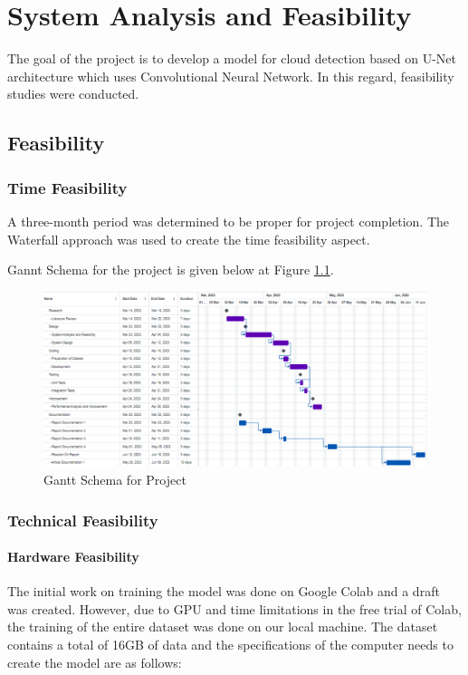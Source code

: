 \chapter{System Analysis and Feasibility}

The goal of the project is to develop a model for cloud detection based on U-Net architecture which uses Convolutional Neural Network. In this regard, feasibility studies were conducted.
\section{Feasibility}
\subsection{Time Feasibility}

A three-month period was determined to be proper for project completion. The Waterfall approach was used to create the time feasibility aspect.

Gannt Schema for the project is given below at Figure \ref{gannt}.
\begin{figure}[htp]
    \centering
    \includegraphics[width=15cm]{projectChapters/images/gannt.png}
    \caption{Gantt Schema for Project}
    \label{gannt}
\end{figure}

\subsection{Technical Feasibility}

\subsubsection{Hardware Feasibility}

The initial work on training the model was done on Google Colab and a draft was
created. However, due to GPU and time limitations in the free trial of Colab, the
training of the entire dataset was done on our local machine. The dataset contains a
total of 16GB of data and the specifications of the computer needs to create the model
are as follows:

